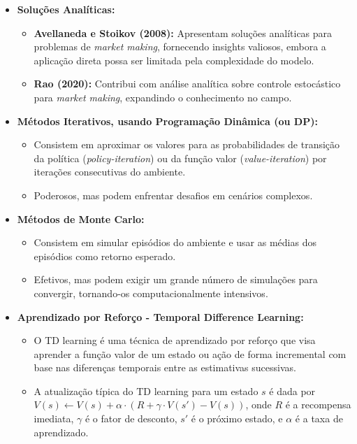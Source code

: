 \begin{itemize}
	\item \textbf{Soluções Analíticas:}
	\begin{itemize}
		\item \textbf{Avellaneda e Stoikov (2008):} Apresentam soluções analíticas para problemas de \textit{market making}, fornecendo insights valiosos, embora a aplicação direta possa ser limitada pela complexidade do modelo.
		\item \textbf{Rao (2020):} Contribui com análise analítica sobre controle estocástico para \textit{market making}, expandindo o conhecimento no campo.
	\end{itemize}
	
	\item \textbf{Métodos Iterativos, usando Programação Dinâmica (ou DP):}
	\begin{itemize}
		\item Consistem em aproximar os valores para as probabilidades de transição da política (\textit{policy-iteration}) ou da função valor (\textit{value-iteration}) por iterações consecutivas do ambiente.
		\item Poderosos, mas podem enfrentar desafios em cenários complexos.
	\end{itemize}
	
	\item \textbf{Métodos de Monte Carlo:}
	\begin{itemize}
		\item Consistem em simular episódios do ambiente e usar as médias dos episódios como retorno esperado.
		\item Efetivos, mas podem exigir um grande número de simulações para convergir, tornando-os computacionalmente intensivos.
	\end{itemize}
	
	\item \textbf{Aprendizado por Reforço - Temporal Difference Learning:}
	\begin{itemize}
		\item O TD learning é uma técnica de aprendizado por reforço que visa aprender a função valor de um estado ou ação de forma incremental com base nas diferenças temporais entre as estimativas sucessivas.
		\item A atualização típica do TD learning para um estado \(s\) é dada por \(V(s) \leftarrow V(s) + \alpha \cdot (R + \gamma \cdot V(s') - V(s))\), onde \(R\) é a recompensa imediata, \(\gamma\) é o fator de desconto, \(s'\) é o próximo estado, e \(\alpha\) é a taxa de aprendizado.
	\end{itemize}
	

\end{itemize}
